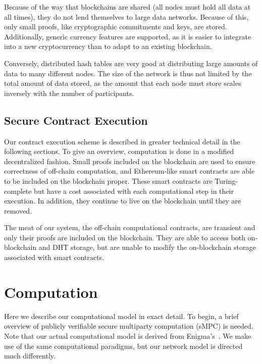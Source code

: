 \documentclass[journal]{IEEEtran}
\begin{document}
\par Because of the way that blockchains are shared (all nodes must hold all data at all times), they do not lend themselves to large data networks. Because of this, only small proofs, like cryptographic commitments and keys, are stored. Additionally, generic currency features are supported, as it is easier to integrate into a new cryptocurrency than to adapt to an existing blockchain.

\par Conversely, distributed hash tables are very good at distributing large amounts of data to many different nodes. The size of the network is thus not limited by the total amount of data stored, as the amount that each node must store scales inversely with the number of participants.

\subsection{Secure Contract Execution}
\par Our contract execution scheme is described in greater technical detail in the following sections. To give an overview, computation is done in a modified decentralized fashion. Small proofs included on the blockchain are used to ensure correctness of off-chain computation, and Ethereum-like smart contracts are able to be included on the blockchain proper. These smart contracts are Turing-complete but have a cost associated with each computational step in their execution. In addition, they continue to live on the blockchain until they are removed.

\par The meat of our system, the off-chain computational contracts, are transient and only their proofs are included on the blockchain. They are able to access both on-blockchain and DHT storage, but are unable to modify the on-blockchain storage associated with smart contracts.

\section{Computation}
\par Here we describe our computational model in exact detail. To begin, a brief overview of publicly verifiable secure multiparty computation (sMPC) is needed. Note that our actual computational model is derived from Enigma's~\cite{Zyskind2015}. We make use of the same computational paradigms, but our network model is directed much differently. 
\end{document}
